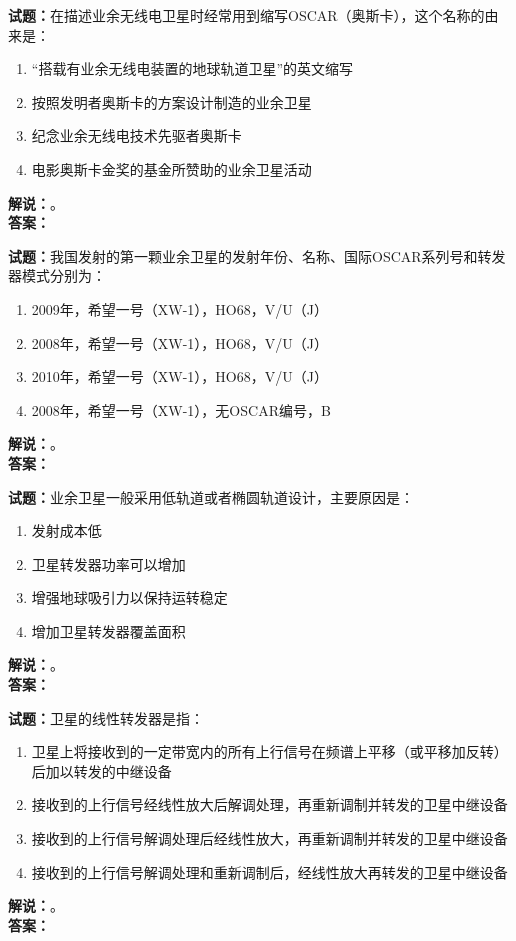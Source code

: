 \documentclass{ctexbook}
\begin{document}
\bigskip

\noindent\textbf{试题：}在描述业余无线电卫星时经常用到缩写OSCAR（奥斯卡），这个名称的由来是：
\begin{enumerate}[leftmargin=3em]
  \item “搭载有业余无线电装置的地球轨道卫星”的英文缩写
  \item 按照发明者奥斯卡的方案设计制造的业余卫星
  \item 纪念业余无线电技术先驱者奥斯卡
  \item 电影奥斯卡金奖的基金所赞助的业余卫星活动
\end{enumerate}
\noindent\textbf{解说：}\textbf{}。\\\noindent\textbf{答案：}

\bigskip

\noindent\textbf{试题：}我国发射的第一颗业余卫星的发射年份、名称、国际OSCAR系列号和转发器模式分别为：
\begin{enumerate}[leftmargin=3em]
  \item 2009年，希望一号（XW-1），HO68，V/U（J）
  \item 2008年，希望一号（XW-1），HO68，V/U（J）
  \item 2010年，希望一号（XW-1），HO68，V/U（J）
  \item 2008年，希望一号（XW-1），无OSCAR编号，B
\end{enumerate}
\noindent\textbf{解说：}\textbf{}。\\\noindent\textbf{答案：}

\bigskip

\noindent\textbf{试题：}业余卫星一般采用低轨道或者椭圆轨道设计，主要原因是：
\begin{enumerate}[leftmargin=3em]
  \item 发射成本低
  \item 卫星转发器功率可以增加
  \item 增强地球吸引力以保持运转稳定
  \item 增加卫星转发器覆盖面积
\end{enumerate}
\noindent\textbf{解说：}\textbf{}。\\\noindent\textbf{答案：}

\bigskip

\noindent\textbf{试题：}卫星的线性转发器是指：
\begin{enumerate}[leftmargin=3em]
  \item 卫星上将接收到的一定带宽内的所有上行信号在频谱上平移（或平移加反转）后加以转发的中继设备
  \item 接收到的上行信号经线性放大后解调处理，再重新调制并转发的卫星中继设备
  \item 接收到的上行信号解调处理后经线性放大，再重新调制并转发的卫星中继设备
  \item 接收到的上行信号解调处理和重新调制后，经线性放大再转发的卫星中继设备
\end{enumerate}
\noindent\textbf{解说：}\textbf{}。\\\noindent\textbf{答案：}
\end{document}
